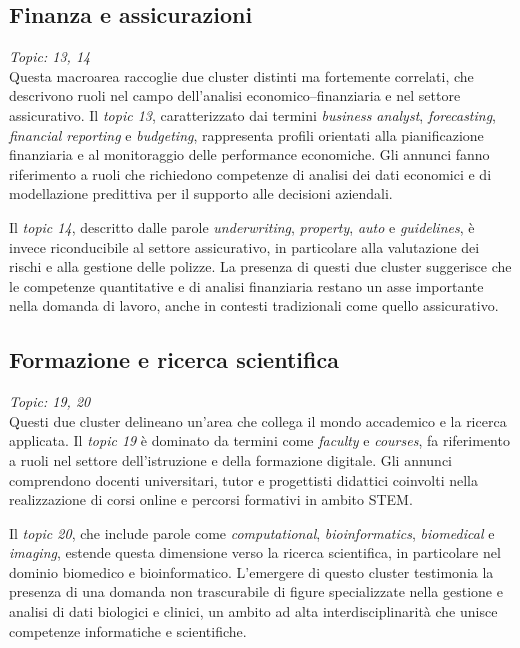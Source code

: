 \subsection{Finanza e assicurazioni}
\textit{Topic: 13, 14} \\
Questa macroarea raccoglie due cluster distinti ma fortemente correlati, che descrivono ruoli nel campo dell’analisi economico–finanziaria e nel settore assicurativo.
Il \textit{topic 13}, caratterizzato dai termini \emph{business analyst}, \emph{forecasting}, \emph{financial reporting} e \emph{budgeting}, rappresenta profili orientati alla pianificazione finanziaria e al monitoraggio delle performance economiche.
Gli annunci fanno riferimento a ruoli che richiedono competenze di analisi dei dati economici e di modellazione predittiva per il supporto alle decisioni aziendali.

Il \textit{topic 14}, descritto dalle parole \emph{underwriting}, \emph{property}, \emph{auto} e \emph{guidelines}, è invece riconducibile al settore assicurativo, in particolare alla valutazione dei rischi e alla gestione delle polizze.
La presenza di questi due cluster suggerisce che le competenze quantitative e di analisi finanziaria restano un asse importante nella domanda di lavoro, anche in contesti tradizionali come quello assicurativo.

\subsection{Formazione e ricerca scientifica}
\textit{Topic: 19, 20} \\
Questi due cluster delineano un’area che collega il mondo accademico e la ricerca applicata.
Il \textit{topic 19} è dominato da termini come \emph{faculty} e \emph{courses}, fa riferimento a ruoli nel settore dell’istruzione e della formazione digitale.
Gli annunci comprendono docenti universitari, tutor e progettisti didattici coinvolti nella realizzazione di corsi online e percorsi formativi in ambito STEM.

Il \textit{topic 20}, che include parole come \emph{computational}, \emph{bioinformatics}, \emph{biomedical} e \emph{imaging}, estende questa dimensione verso la ricerca scientifica, in particolare nel dominio biomedico e bioinformatico.
L’emergere di questo cluster testimonia la presenza di una domanda non trascurabile di figure specializzate nella gestione e analisi di dati biologici e clinici, un ambito ad alta interdisciplinarità che unisce competenze informatiche e scientifiche.

